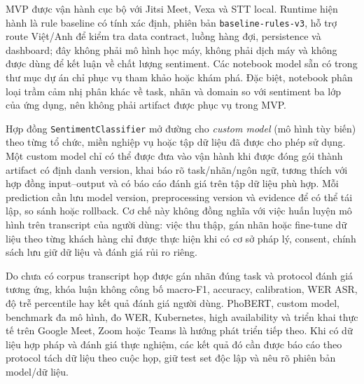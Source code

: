MVP được vận hành cục bộ với Jitsi Meet, Vexa và STT local. Runtime hiện hành là rule baseline có tính xác định, phiên bản \texttt{baseline-rules-v3}, hỗ trợ route Việt/Anh để kiểm tra data contract, luồng hàng đợi, persistence và dashboard; đây không phải mô hình học máy, không phải dịch máy và không được dùng để kết luận về chất lượng sentiment. Các notebook model sẵn có trong thư mục dự án chỉ phục vụ tham khảo hoặc khám phá. Đặc biệt, notebook phân loại trầm cảm nhị phân khác về task, nhãn và domain so với sentiment ba lớp của ứng dụng, nên không phải artifact được phục vụ trong MVP.

Hợp đồng \texttt{SentimentClassifier} mở đường cho \emph{custom model} (mô hình tùy biến) theo từng tổ chức, miền nghiệp vụ hoặc tập dữ liệu đã được cho phép sử dụng. Một custom model chỉ có thể được đưa vào vận hành khi được đóng gói thành artifact có định danh version, khai báo rõ task/nhãn/ngôn ngữ, tương thích với hợp đồng input--output và có báo cáo đánh giá trên tập dữ liệu phù hợp. Mỗi prediction cần lưu model version, preprocessing version và evidence để có thể tái lập, so sánh hoặc rollback. Cơ chế này không đồng nghĩa với việc huấn luyện mô hình trên transcript của người dùng: việc thu thập, gán nhãn hoặc fine-tune dữ liệu theo từng khách hàng chỉ được thực hiện khi có cơ sở pháp lý, consent, chính sách lưu giữ dữ liệu và đánh giá rủi ro riêng.

Do chưa có corpus transcript họp được gán nhãn đúng task và protocol đánh giá tương ứng, khóa luận không công bố macro-F1, accuracy, calibration, WER ASR, độ trễ percentile hay kết quả đánh giá người dùng. PhoBERT, custom model, benchmark đa mô hình, đo WER, Kubernetes, high availability và triển khai thực tế trên Google Meet, Zoom hoặc Teams là hướng phát triển tiếp theo. Khi có dữ liệu hợp pháp và đánh giá thực nghiệm, các kết quả đó cần được báo cáo theo protocol tách dữ liệu theo cuộc họp, giữ test set độc lập và nêu rõ phiên bản model/dữ liệu.

